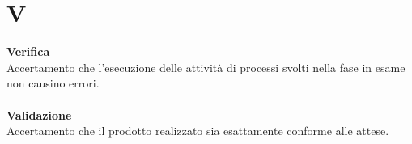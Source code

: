 \section{V}
\textbf{Verifica}\\
Accertamento che l’esecuzione delle attività di processi svolti nella fase in esame non causino errori. \\ \\
\textbf{Validazione}\\
Accertamento che il prodotto realizzato sia esattamente conforme alle attese. \\ \\

\clearpage